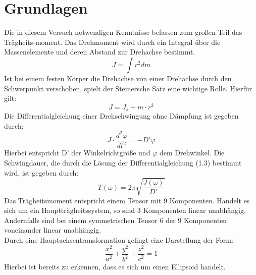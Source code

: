 \documentclass[12pt,a4paper,]{scrreprt}
\let\phi\varphi
\begin{document}
		\section{Grundlagen}
			Die in diesem Versuch notwendigen Kenntnisse befassen zum großen Teil das Trägheits-moment. Das Drehmoment wird durch ein Integral über die Massenelemente und deren Abstand zur Drehachse bestimmt. \\
            \begin{equation}
            J = \int r^2 dm
            \end{equation}
			Ist bei einem festen Körper die Drehachse von einer Drehachse durch den Schwerpunkt verschoben, spielt der Steinersche Satz eine wichtige Rolle.  Hierfür gilt:\\
			\begin{equation}
				J=J_s + m \cdot r^2
			\end{equation}
Die Differentialgleichung einer Drehschwingung ohne Dämpfung ist gegeben durch:
\begin{equation}
J \cdot \frac{ d^2 \phi}{dt^2}=- D' \phi
\end{equation}
Hierbei entspricht D' der Winkelrichtgröße und $\phi$ dem Drehwinkel.
Die Schwingdauer, die durch die Lösung der Differentialgleichung (1.3) bestimmt wird, ist gegeben durch:
\begin{equation}
T(\omega)=2\pi \sqrt{\frac{J(\omega)}{D'}}
\end{equation}
Das Trägheitsmoment entspricht einem Tensor mit 9 Komponenten. Handelt es sich um ein Hauptträgheitssystem, so sind 3 Komponenten linear unabhängig. Andernfalls sind bei einem symmetrischen Tensor 6 der 9 Komponenten voneinander linear unabhängig.\\
Durch eine Hauptachsentransformation gelingt eine Darstellung der Form:
\begin{equation}
\frac{x^2}{a^2}+\frac{y^2}{b^2}+\frac{z^2}{c^2}=1
\end{equation}
Hierbei ist bereits zu erkennen, dass es sich um einen Ellipsoid handelt.
\pagebreak
            
\end{document}
